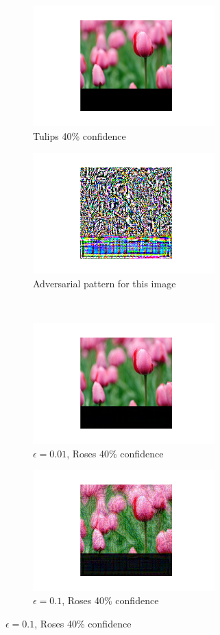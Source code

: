 \begin{figure}[h]
    \begin{subfigure}{0.4\textwidth}
        \caption{Tulips 40\% confidence}
        \includegraphics[width=7cm]{images/og_image}
    \end{subfigure}
    \begin{subfigure}{0.4\textwidth}
        \caption{Adversarial pattern for this image}
        \includegraphics[width=7cm]{images/adv_pattern}
    \end{subfigure}
    \\
    \begin{subfigure}{0.4\textwidth}
        \caption{$\epsilon = 0.01$, Roses 40\% confidence}
        \includegraphics[width=7cm]{images/adv_attack_001}
    \end{subfigure}
    \begin{subfigure}{0.4\textwidth}
        \caption{$\epsilon = 0.1$, Roses 40\% confidence}
        \includegraphics[width=7cm]{images/adv_attack_01}
    \end{subfigure}
\end{figure}

